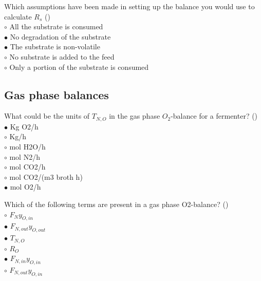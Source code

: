 \documentclass[]{beamer}
\begin{document}
\begin{frame}[shrink] {}
\addtocounter{questions}{1}
\color{blue}
Which assumptions have been made in setting up the balance you would use to calculate $R_s$ ()\\
\color{black}
\setlength{\parindent}{-0.4cm}
{\color{red}$\circ$}   All the substrate is consumed  \\
{\color{red}$\bullet$} No degradation of the substrate   \\
{\color{red}$\bullet$} The substrate is non-volatile   \\
{\color{red}$\circ$} No substrate is added to the feed  \\
{\color{red}$\circ$} Only a portion of the substrate is consumed
\end{frame}

\subsection{Gas phase balances}
\setcounter{questions}{0}

\begin{frame}[shrink] {}
\addtocounter{questions}{1}
\color{blue}
What could be the units of $T_{N,O}$ in the gas phase $O_2$-balance for a fermenter? ()\\
\color{black}
\setlength{\parindent}{-0.4cm}
{\color{red}$\bullet$} Kg O2/h  \\
{\color{red}$\circ$} Kg/h  \\
{\color{red}$\circ$} mol H2O/h\\
{\color{red}$\circ$} mol N2/h  \\
{\color{red}$\circ$} mol CO2/h \\
{\color{red}$\circ$} mol CO2/(m3 broth h) \\
{\color{red}$\bullet$} mol O2/h
\end{frame}

\begin{frame}[shrink] {}
\addtocounter{questions}{1}
\color{blue}
Which of the following terms are present in a gas phase O2-balance?  ()\\
\color{black}
\setlength{\parindent}{-0.4cm}
{\color{red}$\circ$}   $F_{N}y_{O,in}$\\   
{\color{red}$\bullet$}   $F_{N,out}y_{O,out}$\\   
{\color{red}$\bullet$} $T_{N,O}$\\
{\color{red}$\circ$} $R_O$\\
{\color{red}$\bullet$}   $F_{N,in}y_{O,in}$  \\ 
{\color{red}$\circ$}   $F_{N,out}y_{O,in}$   
\end{frame}
\end{document}
